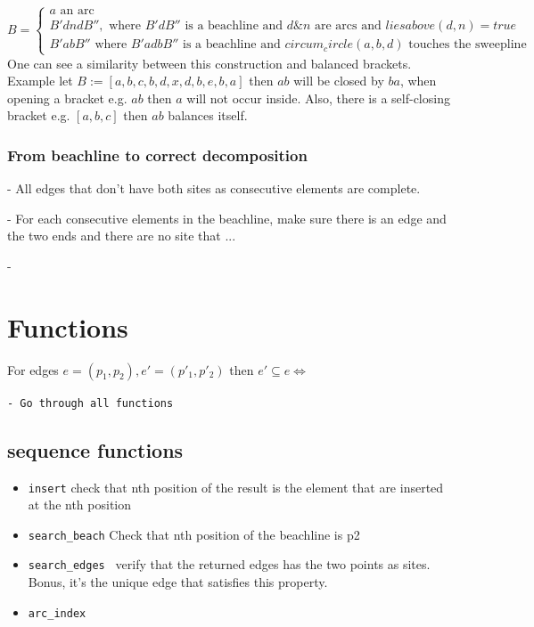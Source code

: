 \documentclass{article}
\begin{document}
 $B =  \begin{cases}
    a \text{ an arc} \\
    B'dndB'', \text{ where } B'dB'' \text{ is a beachline and } d \& n \text{ are arcs and  } liesabove(d, n) = true \\
    B'abB'' \text{ where } B'adbB'' \text{ is a beachline and } circum_circle(a, b, d) \text{ touches the sweepline}  
  \end{cases} $
One can see a similarity between this construction and balanced brackets. %
Example let $ B := \left[a, b, c, b, d, x, d, b, e, b, a \right]$ then $ab$ will be closed by $ba$,  when opening a bracket e.g. $ab$ then $a$ will not occur inside. Also, there is a self-closing bracket e.g. $[a, b, c]$ then $ab$ balances itself.

\subsubsection{From beachline to correct decomposition}
- All edges that don't have both sites as consecutive elements are complete.


- For each consecutive elements in the beachline, make sure there is an edge and the two ends and there are no site that ...

- 


\section{Functions}

For edges $e = \left(p_1, p_2\right), e' = \left(p'_1, p'_2\right)$ then $e' \subseteq e \Longleftrightarrow $


{\color{red} \tt - Go through all functions}
\subsection{sequence functions}
\begin{itemize}
    \item {\tt insert} check that nth position of the result is the element that are inserted at the nth position
    \item {\tt search\_beach} Check that nth position of the beachline is p2
    \item {\tt search\_edges } verify that the returned edges has the two points as sites. Bonus, it's the unique edge that satisfies this property. 
    \item {\tt arc\_index}
    
\end{itemize}
\end{document}
